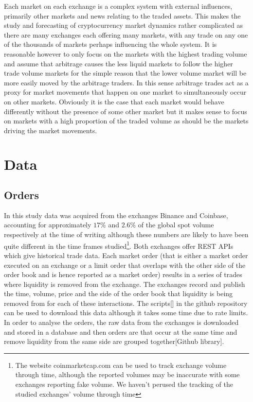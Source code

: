 \documentclass[a4paper,10pt]{article}
\begin{document}
Each market on each exchange is a complex system with external influences, primarily other markets and news relating to the traded assets. This makes the study and forecasting of cryptocurrency market dynamics rather complicated as there are many exchanges each offering many markets, with any trade on any one of the thousands of markets perhaps influencing the whole system. It is reasonable however to only focus on the markets with the highest trading volume and assume that arbitrage causes the less liquid markets to follow the higher trade volume markets for the simple reason that the lower volume market will be more easily moved by the arbitrage traders. In this sense arbitrage trades act as a proxy for market movements that happen on one market to simultaneously occur on other markets. Obviously it is the case that each market would behave differently without the presence of some other market but it makes sense to focus on markets with a high proportion of the traded volume as should be the markets driving the market movements.
\section{Data}
\subsection{Orders}
In this study data was acquired from the exchanges Binance and Coinbase, accounting for approximately $17\%$ and $2.6\%$ of the global spot volume respectively at the time of writing\cite{FTX} although these numbers are likely to have been quite different in the time frames studied\footnote{The website coinmarketcap.com can be used to track exchange volume through time, although the reported volumes may be inaccurate with some exchanges reporting fake volume. We haven't perused the tracking of the studied exchanges' volume through time}. Both exchanges offer REST APIs\cite{binance}\cite{coinbase} which give historical trade data. Each market order (that is either a market order executed on an exchange or a limit order that overlaps with the other side of the order book and is hence reported as a market order) results in a series of trades where liquidity is removed from the exchange. The exchanges record and publish the time, volume, price and the side of the order book that liquidity is being removed from for each of these interactions. The scripts[] in the github repository can be used to download this data although it takes some time due to rate limits. In order to analyse the orders, the raw data from the exchanges is downloaded and stored in a database and then orders are that occur at the same time and remove liquidity from the same side are grouped together[Github library].
\end{document}
